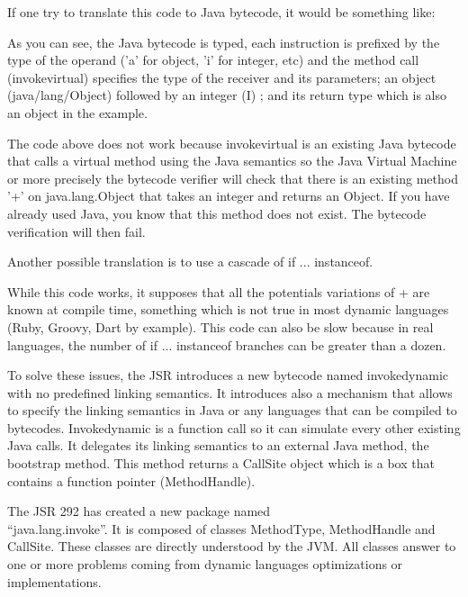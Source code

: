 \documentclass{sig-alternate}
\def \Jsr{JSR\xspace}
\def \JSR{\Jsr 292\xspace}
\def \JVM{JVM\xspace}
\begin{document}
      If one try to translate this code to Java bytecode, it would be something like:

      

      As you can see, the Java bytecode is typed, each instruction is prefixed 
      by the type of the operand ('a' for object, 'i' for integer, etc)
      and the method call (invokevirtual) specifies the type of the receiver and its parameters;
      an object (java/lang/Object) followed by an integer (I) ; and its return type
      which is also an object in the example.

      The code above does not work because invokevirtual is an existing Java bytecode that calls
      a virtual method using the Java semantics so the Java Virtual Machine or more precisely
      the bytecode verifier will check that there is an existing method '+' on java.lang.Object
      that takes an integer and returns an Object. If you have already used Java, you know
      that this method does not exist. The bytecode verification will then fail.

      Another possible translation is to use a cascade of if ... instanceof.

      

      While this code works, it supposes that all the potentials variations of + are known at compile time,
      something which is not true in most dynamic languages (Ruby, Groovy, Dart by example).
      This code can also be slow because in real languages, the number of if ... instanceof branches
      can be greater than a dozen. 

      To solve these issues, the \Jsr introduces a new bytecode named invokedynamic with no predefined
      linking semantics. It introduces also a mechanism that allows to specify the linking semantics in Java
      or any languages that can be compiled to bytecodes.
      Invokedynamic is a function call so it can simulate every other existing Java calls.
      It delegates its linking semantics to an external Java method, the bootstrap method.
      This method returns a CallSite object which is a box that contains a function pointer (MethodHandle).

      The \JSR has created a new package named\\ ``java.lang.invoke''.
      It is composed of classes MethodType, MethodHandle and CallSite.
      These classes are directly understood by the \JVM.
      All classes answer to one or more problems coming from dynamic languages optimizations or implementations.
\end{document}
